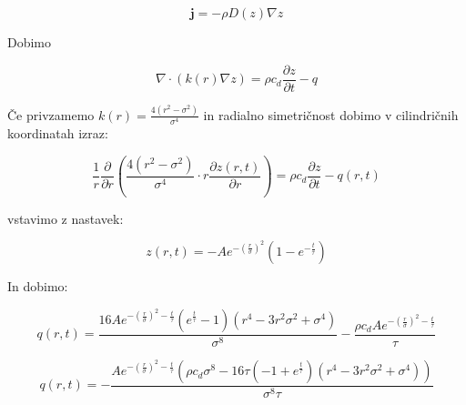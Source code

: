 \documentclass[a4paper, oneside, 12pt]{book}
\begin{document}
\begin{equation}
  \mathbf{j} = - \rho D(z) \nabla z
  \label{tok}
\end{equation}

Dobimo

\begin{equation}
  \nabla \cdot (k(r) \nabla z) = \rho c_d \frac{\partial z}{\partial t} - q
  \label{kontinuitetna-enacba-2}
\end{equation}

Če privzamemo $k(r) = \frac{4(r^2 -\sigma^2)}{\sigma^4}$ in radialno simetričnost dobimo v cilindričnih koordinatah izraz:

\begin{equation}
  \frac{1}{r} \frac{\partial}{\partial r} (\frac{4(r^2 -\sigma^2)}{\sigma^4} \cdot r \frac{\partial z(r,t)}{\partial r}) = \rho c_d \frac{\partial z}{\partial t} - q(r,t)
  \label{kontinuitetna-enacba-3}
\end{equation}

vstavimo z nastavek:

\begin{equation}
  z(r,t) = -A e^{-(\frac{r}{\sigma})^2} (1-e^{-\frac{t}{\tau}})
  \label{nastavek-difuzija-1}
\end{equation}

In dobimo:

\begin{equation}
  q(r,t) = \frac{16 A e^{-(\frac{r}{\sigma})^2-\frac{t}{\tau}}(e^{\frac{t}{\tau}}-1)(r^4-3 r^2 \sigma^2 + \sigma^4)}{\sigma^8} - \frac{\rho c_d A e^{-(\frac{r}{\sigma})^2-\frac{t}{\tau}}}{\tau}
  \label{kontinuitetna-enacba-4}
\end{equation}

\begin{equation}
  q(r,t) = -\frac{A e^{-(\frac{r}{\sigma})^2-\frac{t}{\tau}} (\rho c_d \sigma^8 -16\tau (-1 + e^{\frac{t}{\tau}}) ( r^4-3r^2\sigma^2+\sigma^4) )}{\sigma^8 \tau}
  \label{kontinuitetna-enacba-4}
\end{equation}
\end{document}
